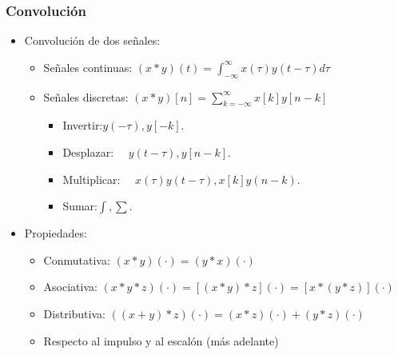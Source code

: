 \begin{frame}
  \frametitle{Convolución}
  \begin{itemize}
    \item Convolución de dos señales:
    \vspace{0.1cm}
    \begin{itemize}
      \item \alert{Señales continuas}: \small \color{blue}$(x \ast y)(t)=\int_{-\infty}^\infty x(\tau)y(t-\tau)d\tau$\color{black}
      \vspace{0.1cm}
      \item \alert{Señales discretas}: \small \color{blue}$(x \ast y)[n]=\sum_{k=-\infty}^\infty x[k]y[n-k]$\color{black}
      \begin{itemize}
        \vspace{0.2cm}
        \item Invertir:\quad\quad \color{cyan}$y(-\tau), y[-k].$\color{black}
        \item Desplazar:~~ \color{cyan}$y(t-\tau), y[n-k].$\color{black}
        \item Multiplicar:~~ \color{cyan}$x(\tau)y(t-\tau), x[k]y(n-k).$\color{black}
        \item Sumar:\quad\quad \color{cyan}$\int, \sum.$\color{black}
      \end{itemize}
    \end{itemize}
    \vspace{0.2cm}
    \item Propiedades:
    \begin{itemize}
      \small
      \item Conmutativa:  $(x \ast y)(\cdot)=(y\ast x)(\cdot)$
      \item Asociativa: $(x \ast y \ast z)(\cdot)=[(x \ast y) \ast z](\cdot)=[x \ast( y \ast z)](\cdot)$
      \item Distributiva: $((x+y) \ast z)(\cdot)=(x \ast z)(\cdot)+(y \ast z)(\cdot)$
      \item Respecto al impulso y al escalón  (más adelante)
    \end{itemize}
  \end{itemize}
\end{frame}


